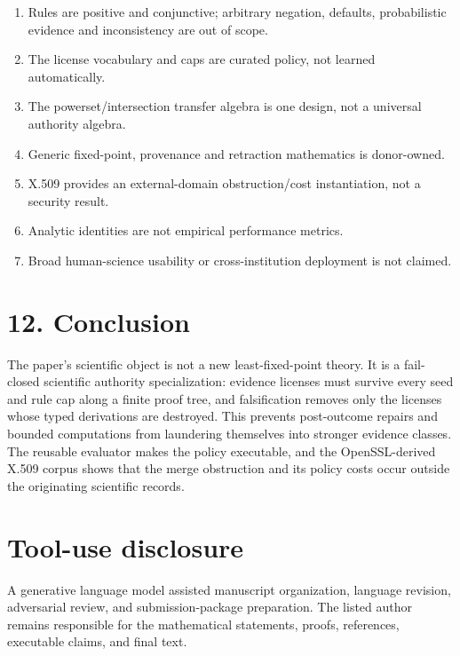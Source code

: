 \documentclass[11pt]{article}
\begin{document}
\begin{enumerate}
\def\labelenumi{\arabic{enumi}.}
\item
  Rules are positive and conjunctive; arbitrary negation, defaults,
  probabilistic evidence and inconsistency are out of scope.
\item
  The license vocabulary and caps are curated policy, not learned
  automatically.
\item
  The powerset/intersection transfer algebra is one design, not a
  universal authority algebra.
\item
  Generic fixed-point, provenance and retraction mathematics is
  donor-owned.
\item
  X.509 provides an external-domain obstruction/cost instantiation, not
  a security result.
\item
  Analytic identities are not empirical performance metrics.
\item
  Broad human-science usability or cross-institution deployment is not
  claimed.
\end{enumerate}

\hypertarget{conclusion}{%
\section{12. Conclusion}\label{conclusion}}

The paper's scientific object is not a new least-fixed-point theory. It
is a fail-closed scientific authority specialization: evidence licenses
must survive every seed and rule cap along a finite proof tree, and
falsification removes only the licenses whose typed derivations are
destroyed. This prevents post-outcome repairs and bounded computations
from laundering themselves into stronger evidence classes. The reusable
evaluator makes the policy executable, and the OpenSSL-derived X.509
corpus shows that the merge obstruction and its policy costs occur
outside the originating scientific records.

\hypertarget{tool-use-disclosure}{%
\section{Tool-use disclosure}\label{tool-use-disclosure}}

A generative language model assisted manuscript organization, language
revision, adversarial review, and submission-package preparation. The
listed author remains responsible for the mathematical statements,
proofs, references, executable claims, and final text.
\end{document}
